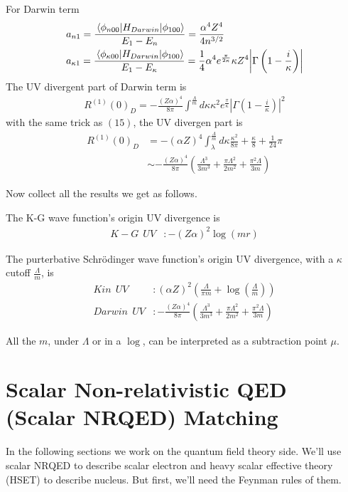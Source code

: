 \documentclass[aps,prd,preprint,showkeys,notitlepage,10pt]{revtex4-1}
\newcommand{\ka}{\kappa}
\begin{document}
For Darwin term
\begin{align*}
	  & a_{n1}=\frac{\mel{\phi_{n00}}{H_{Darwin}}{\phi_{100}}}{E_1-E_n}=\frac{\alpha ^4 Z^4}{4 n^{3/2}}                                                                                     \\
	  & a_{\ka1}=\frac{\mel{\phi_{\ka00}}{H_{Darwin}}{\phi_{100}}}{E_1-E_{\ka}}=\frac{1}{4} \alpha ^4 e^{\frac{\pi }{2 \kappa }} \kappa  Z^4 \abs {\Gamma \left(1-\frac{i}{\kappa }\right)}
\end{align*}
The UV divergent part of Darwin term is
\begin{align}
	R^{(1)}(0)_D=-\frac{(Z\alpha)^4}{8\pi}\int^\frac{\Lambda}{m}d\ka\ka^2e^\frac{\pi}{\ka}|\Gamma(1-\frac{i}{\ka})|^2
\end{align}
with the same trick as $(15)$, the UV divergen part is
\begin{align}
	R^{(1)}(0)_{D} & =-(\alpha Z)^4\int_\lambda^\frac{\Lambda}{m}d\ka\frac{\ka^2}{8\pi}+\frac{\ka}{8}+\frac{1}{24}\pi         \\
	               & \sim -\frac{(Z\alpha)^4}{8\pi}(\frac{\Lambda^3}{3m^3}+\frac{\pi\Lambda^2}{2m^2}+\frac{\pi^2\Lambda}{3m})
\end{align}

Now collect all the results we get as follows.

The K-G wave function's origin UV divergence is
\begin{align}
	K-G\ \ UV & :-(Z\alpha)^2\log(m r)
\end{align}

The purterbative Schr\"odinger wave function's origin UV divergence, with a $\ka$ cutoff $\frac{\Lambda}{m}$, is
\begin{align}
	Kin\ \  UV    & :(\alpha Z)^2(\frac{\Lambda}{\pi m}+\log(\frac{\Lambda}{m}))                                         \\
	Darwin\ \  UV & :-\frac{(Z\alpha)^4}{8\pi}(\frac{\Lambda^3}{3m^3}+\frac{\pi\Lambda^2}{2m^2}+\frac{\pi^2\Lambda}{3m})
\end{align}

All the $m$, under $\Lambda$ or in a $\log$, can be interpreted as a subtraction point $\mu$.

\section{Scalar Non-relativistic QED (Scalar NRQED) Matching\label{sec:fr}}
In the following sections we work on the quantum field theory side. We'll use scalar NRQED to describe scalar electron and heavy scalar effective theory (HSET) to describe nucleus. But first, we'll need the Feynman rules of them.
\end{document}

